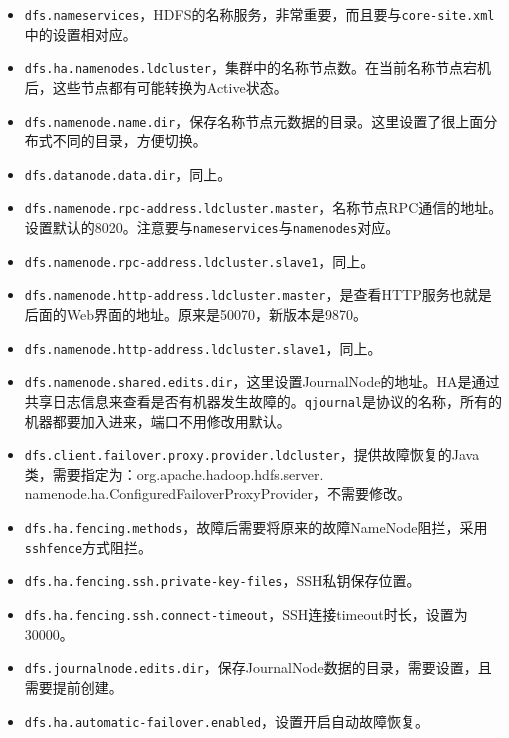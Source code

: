 \begin{itemize}
	\item \lstinline{dfs.nameservices}，HDFS的名称服务，非常重要，而且要与\lstinline{core-site.xml}中的设置相对应。
	\item \lstinline{dfs.ha.namenodes.ldcluster}，集群中的名称节点数。在当前名称节点宕机后，这些节点都有可能转换为Active状态。
	\item \lstinline{dfs.namenode.name.dir}，保存名称节点元数据的目录。这里设置了很上面分布式不同的目录，方便切换。
	\item \lstinline{dfs.datanode.data.dir}，同上。
	\item \lstinline{dfs.namenode.rpc-address.ldcluster.master}，名称节点RPC通信的地址。设置默认的8020。注意要与\lstinline{nameservices}与\lstinline{namenodes}对应。
	\item \lstinline{dfs.namenode.rpc-address.ldcluster.slave1}，同上。
	\item \lstinline{dfs.namenode.http-address.ldcluster.master}，是查看HTTP服务也就是后面的Web界面的地址。原来是50070，新版本是9870。
	\item \lstinline{dfs.namenode.http-address.ldcluster.slave1}，同上。
	\item \lstinline{dfs.namenode.shared.edits.dir}，这里设置JournalNode的地址。HA是通过共享日志信息来查看是否有机器发生故障的。\lstinline{qjournal}是协议的名称，所有的机器都要加入进来，端口不用修改用默认。
	\item \lstinline{dfs.client.failover.proxy.provider.ldcluster}，提供故障恢复的Java类，需要指定为：org.apache.hadoop.hdfs.server.
	namenode.ha.ConfiguredFailoverProxyProvider，不需要修改。
	\item \lstinline{dfs.ha.fencing.methods}，故障后需要将原来的故障NameNode阻拦，采用\lstinline{sshfence}方式阻拦。
	\item \lstinline{dfs.ha.fencing.ssh.private-key-files}，SSH私钥保存位置。
	\item \lstinline{dfs.ha.fencing.ssh.connect-timeout}，SSH连接timeout时长，设置为30000。
	\item \lstinline{dfs.journalnode.edits.dir}，保存JournalNode数据的目录，需要设置，且需要提前创建。
	\item \lstinline{dfs.ha.automatic-failover.enabled}，设置开启自动故障恢复。
\end{itemize}

